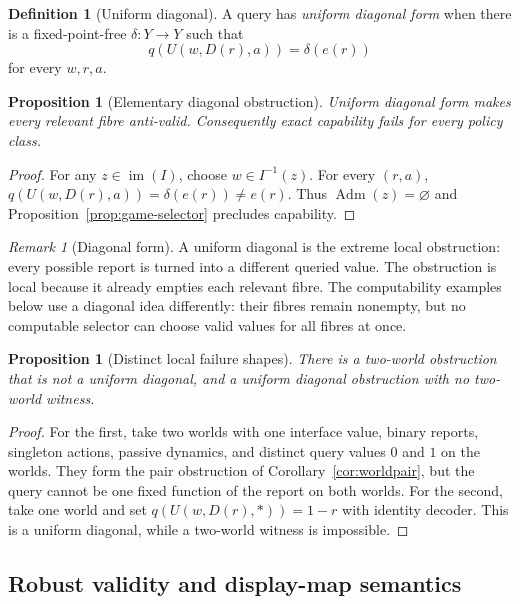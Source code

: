 \documentclass[11pt]{article}
\theoremstyle{plain}
\newtheorem{proposition}[theorem]{Proposition}
\theoremstyle{definition}
\newtheorem{definition}[theorem]{Definition}
\theoremstyle{remark}
\newtheorem{remark}[theorem]{Remark}
\newcommand{\im}{\operatorname{im}}
\newcommand{\Adm}{\operatorname{Adm}}
\begin{document}
\begin{definition}[Uniform diagonal]\label{def:diag}
A query has \emph{uniform diagonal form} when there is a fixed-point-free
$\delta:Y\to Y$ such that
\[
q(U(w,D(r),a))=\delta(e(r))
\]
for every $w,r,a$.
\end{definition}

\begin{proposition}[Elementary diagonal obstruction]\label{prop:diagonal}
Uniform diagonal form makes every relevant fibre anti-valid. Consequently exact
capability fails for every policy class.
\end{proposition}

\begin{proof}
For any $z\in\im(I)$, choose $w\in I^{-1}(z)$. For every $(r,a)$,
$q(U(w,D(r),a))=\delta(e(r))\ne e(r)$. Thus $\Adm(z)=\varnothing$ and
Proposition~\ref{prop:game-selector} precludes capability.
\end{proof}

\begin{remark}[Diagonal form]
A uniform diagonal is the extreme local obstruction: every possible report is
turned into a different queried value. The obstruction is local because it
already empties each relevant fibre. The computability examples below use a
diagonal idea differently: their fibres remain nonempty, but no computable
selector can choose valid values for all fibres at once.
\end{remark}

\begin{proposition}[Distinct local failure shapes]\label{prop:failure-shapes}
There is a two-world obstruction that is not a uniform diagonal, and a uniform
diagonal obstruction with no two-world witness.
\end{proposition}

\begin{proof}
For the first, take two worlds with one interface value, binary reports,
singleton actions, passive dynamics, and distinct query values $0$ and $1$ on
the worlds. They form the pair obstruction of
Corollary~\ref{cor:worldpair}, but the query cannot be one fixed function of the
report on both worlds. For the second, take one world and set
$q(U(w,D(r),\ast))=1-r$ with identity decoder. This is a uniform diagonal, while
a two-world witness is impossible.
\end{proof}


\subsection{Robust validity and display-map semantics}
\end{document}
